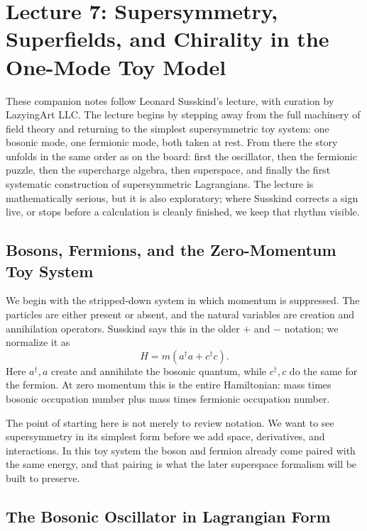 \chapter{Lecture 7: Supersymmetry, Superfields, and Chirality in the One-Mode Toy Model}

These companion notes follow Leonard Susskind's lecture, with curation by LazyingArt LLC. The lecture begins by stepping away from the full machinery of field theory and returning to the simplest supersymmetric toy system: one bosonic mode, one fermionic mode, both taken at rest. From there the story unfolds in the same order as on the board: first the oscillator, then the fermionic puzzle, then the supercharge algebra, then superspace, and finally the first systematic construction of supersymmetric Lagrangians. The lecture is mathematically serious, but it is also exploratory; where Susskind corrects a sign live, or stops before a calculation is cleanly finished, we keep that rhythm visible.

\section{Bosons, Fermions, and the Zero-Momentum Toy System}

We begin with the stripped-down system in which momentum is suppressed. The particles are either present or absent, and the natural variables are creation and annihilation operators. Susskind says this in the older \(+\) and \(-\) notation; we normalize it as
\begin{equation}
H = m\left(a^\dagger a + c^\dagger c\right).
\end{equation}
Here \(a^\dagger,a\) create and annihilate the bosonic quantum, while \(c^\dagger,c\) do the same for the fermion. At zero momentum this is the entire Hamiltonian: mass times bosonic occupation number plus mass times fermionic occupation number.

The point of starting here is not merely to review notation. We want to see supersymmetry in its simplest form before we add space, derivatives, and interactions. In this toy system the boson and fermion already come paired with the same energy, and that pairing is what the later superspace formalism will be built to preserve.

\section{The Bosonic Oscillator in Lagrangian Form}

